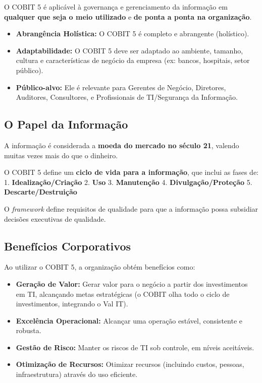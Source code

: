 \documentclass[
]{book}
\providecommand{\tightlist}{%
  \setlength{\itemsep}{0pt}\setlength{\parskip}{0pt}}
\begin{document}
O COBIT 5 é aplicável à governança e gerenciamento da informação em \textbf{qualquer que seja o meio utilizado} e \textbf{de ponta a ponta na organização}.

\begin{itemize}
\tightlist
\item
  \textbf{Abrangência Holística:} O COBIT 5 é completo e abrangente (holístico).
\item
  \textbf{Adaptabilidade:} O COBIT 5 deve ser adaptado ao ambiente, tamanho, cultura e características de negócio da empresa (ex: bancos, hospitais, setor público).
\item
  \textbf{Público-alvo:} Ele é relevante para Gerentes de Negócio, Diretores, Auditores, Consultores, e Profissionais de TI/Segurança da Informação.
\end{itemize}

\subsection{O Papel da Informação}\label{o-papel-da-informauxe7uxe3o}

A informação é considerada a \textbf{moeda do mercado no século 21}, valendo muitas vezes mais do que o dinheiro.

O COBIT 5 define um \textbf{ciclo de vida para a informação}, que inclui as fases de: 1. \textbf{Idealização/Criação} 2. \textbf{Uso} 3. \textbf{Manutenção} 4. \textbf{Divulgação/Proteção} 5. \textbf{Descarte/Destruição}

O \emph{framework} define requisitos de qualidade para que a informação possa subsidiar decisões executivas de qualidade.

\subsection{Benefícios Corporativos}\label{benefuxedcios-corporativos}

Ao utilizar o COBIT 5, a organização obtém benefícios como:

\begin{itemize}
\tightlist
\item
  \textbf{Geração de Valor:} Gerar valor para o negócio a partir dos investimentos em TI, alcançando metas estratégicas (o COBIT olha todo o ciclo de investimentos, integrando o Val IT).
\item
  \textbf{Excelência Operacional:} Alcançar uma operação estável, consistente e robusta.
\item
  \textbf{Gestão de Risco:} Manter os riscos de TI sob controle, em níveis aceitáveis.
\item
  \textbf{Otimização de Recursos:} Otimizar recursos (incluindo custos, pessoas, infraestrutura) através do uso eficiente.
\end{itemize}
\end{document}
